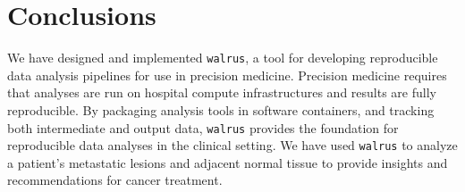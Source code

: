 \section{Conclusions} 
We have designed and implemented \texttt{walrus}, a tool for developing 
reproducible data analysis pipelines for use in precision medicine. Precision
medicine requires that analyses are run on hospital compute infrastructures and
results are fully reproducible. By packaging analysis tools in software
containers, and tracking both intermediate and output data, \texttt{walrus}
provides the foundation for reproducible data analyses in the clinical setting.
We have used \texttt{walrus} to analyze a patient's metastatic lesions and
adjacent normal tissue to provide insights and recommendations for  cancer
treatment. 

